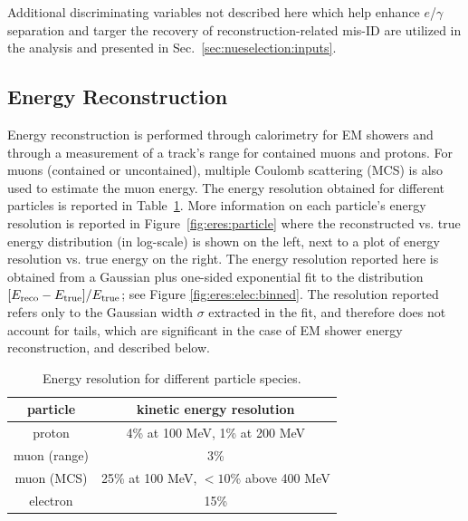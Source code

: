 Additional discriminating variables not described here which help enhance $e$/$\gamma$ separation and targer the recovery of reconstruction-related mis-ID are utilized in the analysis and presented in Sec.~\ref{sec:nueselection:inputs}.


\subsection{Energy Reconstruction}
\label{sec:ereco}
\par Energy reconstruction is performed through calorimetry for EM showers and through a measurement of a track's range for contained muons and protons. For muons (contained or uncontained), multiple Coulomb scattering (MCS) is also used to estimate the muon energy. The energy resolution obtained for different particles is reported in Table~\ref{tab:eres}. More information on each particle's energy resolution is reported in Figure~\ref{fig:eres:particle} where the reconstructed vs. true energy distribution (in log-scale) is shown on the left, next to a plot of energy resolution vs. true energy on the right. The energy resolution reported here is obtained from a Gaussian plus one-sided exponential fit to the distribution $[E_{\rm reco}-E_{\rm true}] / E_{\rm true}$; see Figure \ref{fig:eres:elec:binned}. The resolution reported refers only to the Gaussian width $\sigma$ extracted in the fit, and therefore does not account for tails, which are significant in the case of EM shower energy reconstruction, and described below.


\begin{table}[H]
\centering
  \begin{tabular}{ | c | c |  }
    \hline
    particle & kinetic energy resolution  \\ \hline
    proton & 4\% at 100 MeV, 1\% at 200 MeV \\ \hline
    muon (range) & 3\%  \\ \hline
    muon (MCS) & 25\% at 100 MeV, $< 10$\% above 400 MeV  \\ \hline
    electron & 15\%  \\
    \hline
    
  \end{tabular}
  \caption{\label{tab:eres} Energy resolution for different particle species.}
 \end{table}
 
